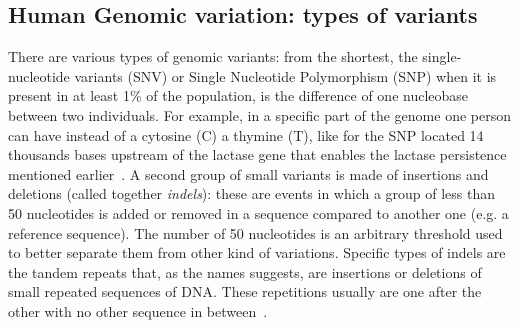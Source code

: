 \subsection{Human Genomic variation: types of variants}
There are various types of genomic variants: from the shortest, the single-nucleotide variants (SNV) or Single Nucleotide Polymorphism (SNP) when it is present in at least 1\% of the population, is the difference of one nucleobase between two individuals. For example, in a specific part of the genome one person can have instead of a cytosine (C) a thymine (T), like for the SNP located 14 thousands bases upstream of the lactase gene that enables the lactase persistence mentioned earlier~\cite{lactase_persistance}.
A second group of small variants is made of insertions and deletions (called together \emph{indels}): these are events in which a group of less than 50 nucleotides is added or removed in a sequence compared to another one (e.g. a reference sequence). The number of 50 nucleotides is an arbitrary threshold used to better separate them from other kind of variations. Specific types of indels are the tandem repeats that, as the names suggests, are insertions or deletions of small repeated sequences of DNA. These repetitions usually are one after the other with no other sequence in between~\cite{nih_variation}.\\

